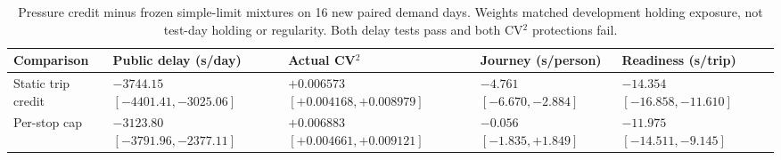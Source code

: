 \begin{table}[t]
\centering
\footnotesize
\caption{Pressure credit minus frozen simple-limit mixtures on 16 new paired demand days. Weights matched development holding exposure, not test-day holding or regularity. Both delay tests pass and both CV$^2$ protections fail.}
\label{tab:limits}
\setlength{\tabcolsep}{4pt}
\begin{tabularx}{\textwidth}{@{}lYYYY@{}}
\toprule
Comparison & Public delay (s/day) & Actual CV$^2$ & Journey (s/person) & Readiness (s/trip) \\
\midrule
Static trip credit &  &  &  &  \\[3pt]
Per-stop cap &  &  &  &  \\[3pt]
\bottomrule
\end{tabularx}
\end{table}

